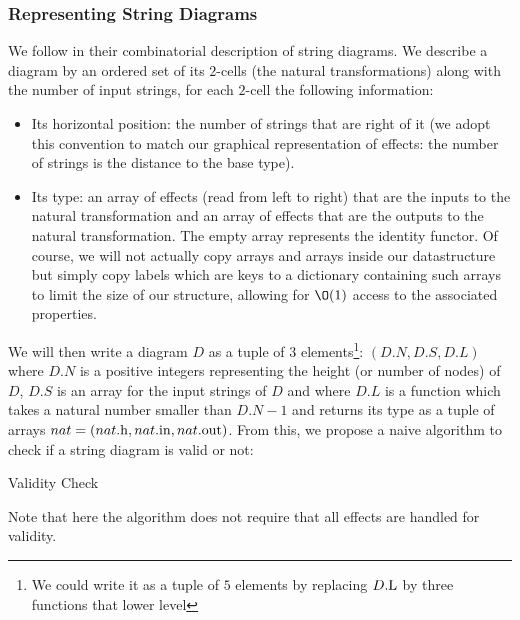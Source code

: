 \documentclass[math, english, info]{cours}
\begin{document}
\subsubsection{Representing String Diagrams}
We follow  in their combinatorial description
of string diagrams. We describe a diagram by an ordered set of its $2$-cells (the natural
transformations) along with the number of input strings, for each $2$-cell the following
information:
\begin{itemize}
	\item Its horizontal position: the number of strings that are right of it (we adopt this
	      convention to match our graphical representation of effects: the number of strings
	      is the distance to the base type).
	\item Its type: an array of effects (read from left to right) that are the inputs to the
	      natural transformation and an array of effects that are the outputs to the natural
	      transformation. The empty array represents the identity functor.
	      Of course, we will not actually copy arrays and arrays inside our datastructure but
	      simply copy labels which are keys to a dictionary containing such arrays to limit
	      the size of our structure, allowing for $\O(1)$ access to the associated properties.
\end{itemize}
We will then write a diagram $D$ as a tuple of $3$ elements\footnote{We could write it
	as a tuple of $5$ elements by replacing $D\mathrm{.L}$ by three functions that lower level}:
$\left( D.N, D.S, D.L \right)$ where $D.N$ is a positive integers representing the
height (or number of nodes) of $D$, $D.S$ is an array for the input strings of $D$ and
where $D.L$ is a function which takes a natural number smaller than $D.N - 1$ and
returns its type as a tuple of arrays
$nat = \left( nat\mathrm{.h}, nat\mathrm{.in}, nat\mathrm{.out} \right)$.
From this, we propose a naive algorithm to check if a string diagram is valid or not:
\begin{algorithm}[h]
	\caption{Validity Check}
	\begin{algorithmic}
		\EndIf
		\EndFor
		\EndFunction
	\end{algorithmic}
\end{algorithm}
Note that here the algorithm does not require that all effects are handled for validity.
\end{document}
